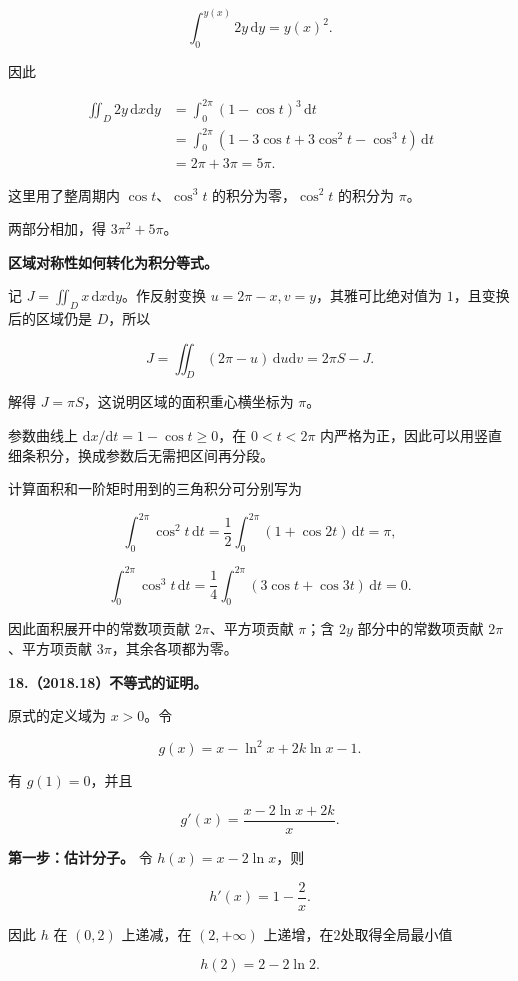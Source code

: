\documentclass[UTF8,11pt,fontset=windows]{ctexart}
\begin{document}
$$
\int_0^{y(x)}2y\,\mathrm dy=y(x)^2.
$$

因此

$$
\begin{aligned}
\iint_D2y\,\mathrm dx\mathrm dy
&=\int_0^{2\pi}(1-\cos t)^3\,\mathrm dt\\
&=\int_0^{2\pi}(1-3\cos t+3\cos^2t-\cos^3t)\,\mathrm dt\\
&=2\pi+3\pi=5\pi.
\end{aligned}
$$

这里用了整周期内 $\cos t$、$\cos^3t$ 的积分为零，$\cos^2t$ 的积分为 $\pi$。

两部分相加，得 $3\pi^2+5\pi$。

\textbf{区域对称性如何转化为积分等式。}

记 $J=\iint_Dx\,\mathrm dx\mathrm dy$。作反射变换 $u=2\pi-x,v=y$，其雅可比绝对值为 $1$，且变换后的区域仍是 $D$，所以

$$
J=\iint_D(2\pi-u)\,\mathrm du\mathrm dv=2\pi S-J.
$$

解得 $J=\pi S$，这说明区域的面积重心横坐标为 $\pi$。

参数曲线上 $\mathrm dx/\mathrm dt=1-\cos t\ge0$，在 $0<t<2\pi$ 内严格为正，因此可以用竖直细条积分，换成参数后无需把区间再分段。

计算面积和一阶矩时用到的三角积分可分别写为

$$
\int_0^{2\pi}\cos^2t\,\mathrm dt
=\frac12\int_0^{2\pi}(1+\cos2t)\,\mathrm dt=\pi,
$$

$$
\int_0^{2\pi}\cos^3t\,\mathrm dt
=\frac14\int_0^{2\pi}(3\cos t+\cos3t)\,\mathrm dt=0.
$$

因此面积展开中的常数项贡献 $2\pi$、平方项贡献 $\pi$；含 $2y$ 部分中的常数项贡献 $2\pi$、平方项贡献 $3\pi$，其余各项都为零。

\clearpage

\textbf{18.（2018.18）不等式的证明。}

原式的定义域为 $x>0$。令

$$
g(x)=x-\ln^2x+2k\ln x-1.
$$

有 $g(1)=0$，并且

$$
g'(x)=\frac{x-2\ln x+2k}{x}.
$$

\textbf{第一步：估计分子。} 令 $h(x)=x-2\ln x$，则

$$
h'(x)=1-\frac2x.
$$

因此 $h$ 在 $(0,2)$ 上递减，在 $(2,+\infty)$ 上递增，在2处取得全局最小值

$$
h(2)=2-2\ln2.
$$
\end{document}

